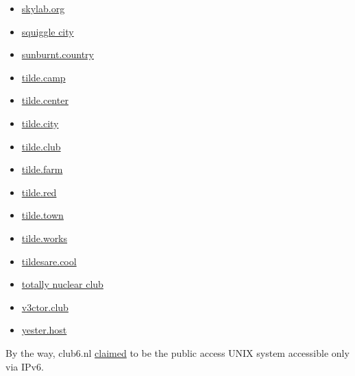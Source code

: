 \begin{multicols}{2}
\begin{itemize}
		\item \href{http://skylab.org/}{skylab.org}
		\item \href{http://squiggle.city/}{squiggle city}
		\item \href{http://sunburnt.country/}{sunburnt.country}
		\item \href{http://tilde.camp/}{tilde.camp}
		\item \href{https://tilde.center/}{tilde.center}
		\item \href{http://tilde.city/}{tilde.city}
		\item \href{http://tilde.club/}{tilde.club}
		\item \href{http://tilde.farm/}{tilde.farm}
		\item \href{http://tilde.red/}{tilde.red}
		\item \href{http://tilde.town/}{tilde.town}
		\item \href{http://tilde.works/}{tilde.works}
		\item \href{http://tildesare.cool/}{tildesare.cool}
		\item \href{http://totallynuclear.club/}{totally nuclear club}
		\item \href{https://www.v3ctor.club/}{v3ctor.club}
		\item \href{http://yester.host/}{yester.host}
	\end{itemize}
\end{multicols}

By the way, club6.nl \href{http://tildesare.cool/~imt/2015/01/04/club6-nl-is-up.html}{claimed} to be the public access UNIX system accessible only via IPv6.
